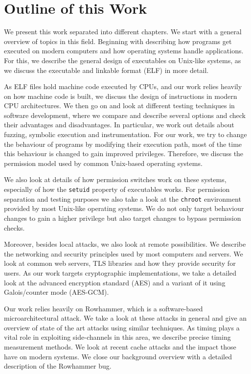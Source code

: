 \section{Outline of this Work}

We present this work separated into different chapters. We start with a general
overview of topics in this field. Beginning with describing how programs get
executed on modern computers and how operating systems handle applications. For
this, we describe the general design of executables on Unix-like systems, as we
discuss the executable and linkable format (ELF) in more detail.

As ELF files hold machine code executed by CPUs, and our work relies heavily on
how machine code is built, we discuss the design of instructions in modern
CPU architectures.  We then go on and look at different testing techniques in
software development, where we compare and describe several options and check
their advantages and disadvantages. In particular, we work out details about
fuzzing, symbolic execution and instrumentation. For our work, we try to change
the behaviour of programs by modifying their execution path, most of the time
this behaviour is changed to gain improved privileges. Therefore, we discuss the
permission model used by common Unix-based operating systems.

We also look at details of how permission switches work on these systems,
especially of how the \texttt{setuid} property of executables works. For
permission separation and testing purposes we also take a look at the
\texttt{chroot} environment provided by most Unix-like operating systems. We
do not only target behaviour changes to gain a higher privilege but also target
changes to bypass permission checks.

Moreover, besides local attacks, we also look at remote possibilities. We
describe the networking and security principles used by most computers and
servers. We look at common web servers, TLS libraries and how they provide
security for users. As our work targets cryptographic implementations, we take
a detailed look at the advanced encryption standard (AES) and a variant of it
using Galois/counter mode (AES-GCM).

Our work relies heavily on Rowhammer, which is a software-based
microarchitectural attack. We take a look at these attacks in general and give
an overview of state of the art attacks using similar techniques. As timing
plays a vital role in exploiting side-channels in this area, we describe precise
timing measurement methods. We look at recent cache attacks and the impact
those have on modern systems. We close our background overview with a detailed
description of the Rowhammer bug.


